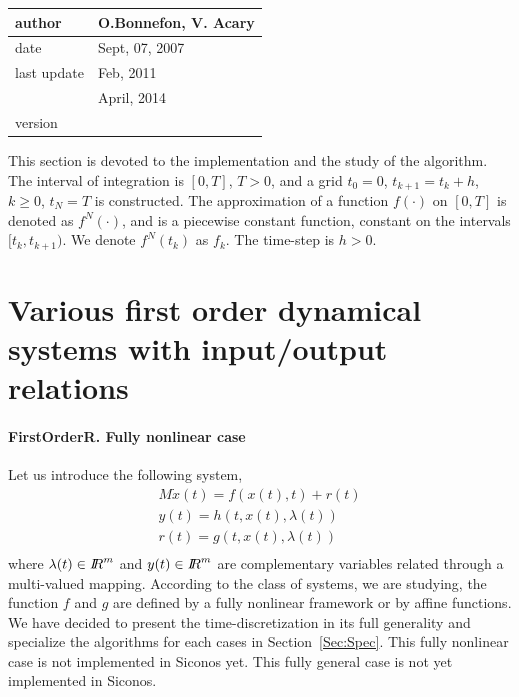  \begin{table}[!ht]
  \begin{tabular}{|l|l|}
    \hline
    author  & O.Bonnefon, V. Acary\\
    \hline
    date    & Sept, 07, 2007 \\
    last update        & Feb, 2011 \\
                       & April, 2014 \\
    \hline
    version &  \\
    \hline
  \end{tabular}
\end{table}



This section is devoted to the implementation and the study  of the algorithm. The interval of integration is $[0,T]$, $T>0$, and a grid $t_{0}=0$, $t_{k+1}=t_{k}+h$, $k \geq 0$, $t_{N}=T$ is constructed. The approximation of a function $f(\cdot)$ on $[0,T]$ is denoted as $f^{N}(\cdot)$, and is a piecewise constant function, constant on the intervals $[t_{k},t_{k+1})$. We denote $f^{N}(t_{k})$ as $f_{k}$. The time-step is $h>0$.


\section{Various first order dynamical systems with input/output relations}

\paragraph{FirstOrderR. Fully nonlinear case}
Let us introduce the following system,
\begin{equation}
\begin{array}{l}
M \dot{x}(t) = f(x(t),t) + r(t)  \\[2mm]
y(t) = h(t,x(t),\lambda (t)) \\[2mm]
r(t) = g(t,x(t),\lambda (t) ) \\[2mm]
\end{array}
\label{first-DS}
\end{equation}
where $\lambda(t) \in \mbox{\rm $I\!\!R$}^m$  and $y(t) \in \mbox{\rm $I\!\!R$}^m$ are  complementary variables related through a multi-valued mapping.   According to the class of systems, we are studying, the function $f$ and $g$ are defined by a fully nonlinear framework or by affine functions. We have decided to present the time-discretization in its full generality and specialize the algorithms for each cases in Section~\ref{Sec:Spec}. This fully nonlinear case is not  implemented in Siconos yet. This fully general case is not yet implemented in Siconos.

